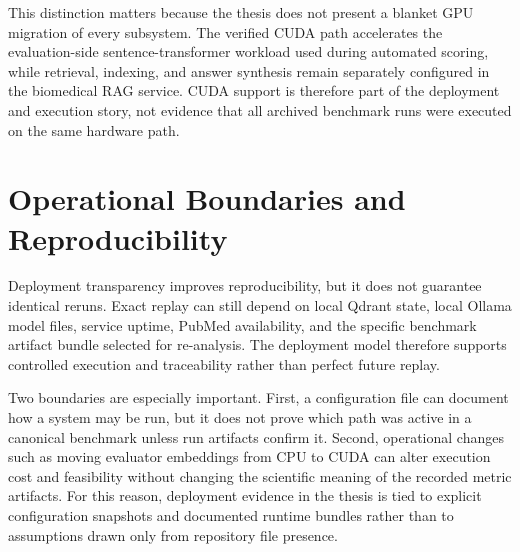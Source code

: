 This distinction matters because the thesis does not present a blanket GPU migration of every subsystem. The verified CUDA path accelerates the evaluation-side sentence-transformer workload used during automated scoring, while retrieval, indexing, and answer synthesis remain separately configured in the biomedical RAG service. CUDA support is therefore part of the deployment and execution story, not evidence that all archived benchmark runs were executed on the same hardware path.

\section{Operational Boundaries and Reproducibility}

Deployment transparency improves reproducibility, but it does not guarantee identical reruns. Exact replay can still depend on local Qdrant state, local Ollama model files, service uptime, PubMed availability, and the specific benchmark artifact bundle selected for re-analysis. The deployment model therefore supports controlled execution and traceability rather than perfect future replay.

Two boundaries are especially important. First, a configuration file can document how a system may be run, but it does not prove which path was active in a canonical benchmark unless run artifacts confirm it. Second, operational changes such as moving evaluator embeddings from CPU to CUDA can alter execution cost and feasibility without changing the scientific meaning of the recorded metric artifacts. For this reason, deployment evidence in the thesis is tied to explicit configuration snapshots and documented runtime bundles rather than to assumptions drawn only from repository file presence.
